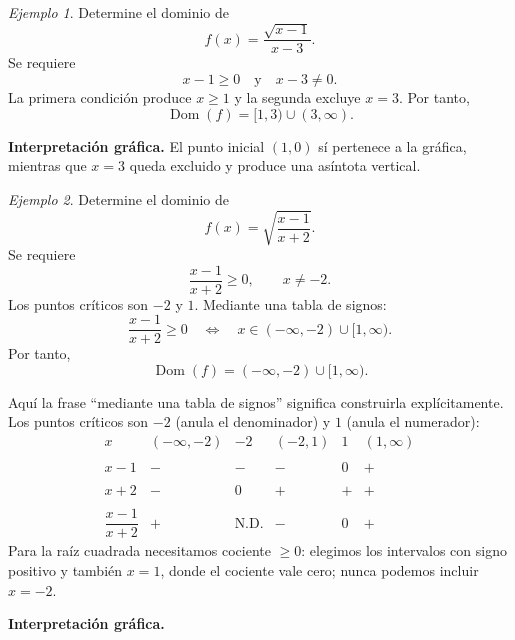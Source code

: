 \documentclass[12pt]{article}
\theoremstyle{remark}
\newtheorem{ejemplo}{Ejemplo}[section]
\newcommand{\Dom}{\operatorname{Dom}}
\begin{document}
\begin{ejemplo}
Determine el dominio de
\[
f(x)=\frac{\sqrt{x-1}}{x-3}.
\]
Se requiere
\[
x-1\geq0
\quad\text{y}\quad
x-3\neq0.
\]
La primera condición produce $x\geq1$ y la segunda excluye $x=3$. Por tanto,
\[
\Dom(f)=[1,3)\cup(3,\infty).
\]

\textbf{Interpretación gráfica.} El punto inicial $(1,0)$ sí pertenece a la
gráfica, mientras que $x=3$ queda excluido y produce una asíntota vertical.
\begin{center}
\end{center}
\end{ejemplo}

\begin{ejemplo}
Determine el dominio de
\[
f(x)=\sqrt{\frac{x-1}{x+2}}.
\]
Se requiere
\[
\frac{x-1}{x+2}\geq0,
\qquad x\neq-2.
\]
Los puntos críticos son $-2$ y $1$. Mediante una tabla de signos:
\[
\frac{x-1}{x+2}\geq0
\quad\Longleftrightarrow\quad
x\in(-\infty,-2)\cup[1,\infty).
\]
Por tanto,
\[
\Dom(f)=(-\infty,-2)\cup[1,\infty).
\]

Aquí la frase ``mediante una tabla de signos'' significa construirla
explícitamente. Los puntos críticos son $-2$ (anula el denominador) y $1$
(anula el numerador):
\[
\begin{array}{c|ccccc}
x&(-\infty,-2)&-2&(-2,1)&1&(1,\infty)\\\\ \hline
x-1&-&-&-&0&+\\\\
x+2&-&0&+&+&+\\\\ \hline
\dfrac{x-1}{x+2}&+&\text{N.D.}&-&0&+
\end{array}
\]
Para la raíz cuadrada necesitamos cociente $\ge0$: elegimos los intervalos
con signo positivo y también $x=1$, donde el cociente vale cero; nunca podemos
incluir $x=-2$.

\textbf{Interpretación gráfica.}
\begin{center}
\end{center}
\end{ejemplo}
\end{document}
